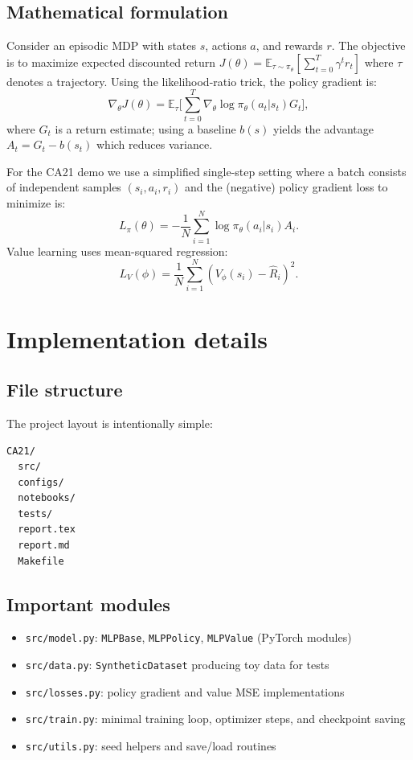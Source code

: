 \documentclass[11pt,a4paper]{article}
\newcommand{\code}[1]{\texttt{#1}}
\begin{document}
\subsection{Mathematical formulation}
Consider an episodic MDP with states $s$, actions $a$, and rewards $r$. The objective is to maximize expected discounted return $J(\theta)=\mathbb{E}_{\tau\sim\pi_\theta}[\sum_{t=0}^T \gamma^t r_t]$ where $\tau$ denotes a trajectory. Using the likelihood-ratio trick, the policy gradient is:
\begin{equation}
\nabla_\theta J(\theta)=\mathbb{E}_{\tau} \Big[ \sum_{t=0}^T \nabla_\theta \log \pi_\theta(a_t|s_t) G_t \Big],
\end{equation}
where $G_t$ is a return estimate; using a baseline $b(s)$ yields the advantage $A_t = G_t - b(s_t)$ which reduces variance.

For the CA21 demo we use a simplified single-step setting where a batch consists of independent samples $(s_i,a_i,r_i)$ and the (negative) policy gradient loss to minimize is:
\begin{equation}
L_{\pi}(\theta) = -\frac{1}{N} \sum_{i=1}^N \log \pi_\theta(a_i|s_i) A_i.
\end{equation}
Value learning uses mean-squared regression:
\begin{equation}
L_V(\phi) = \frac{1}{N} \sum_{i=1}^N (V_\phi(s_i) - \hat{R}_i)^2.
\end{equation}

\section{Implementation details}
\subsection{File structure}
The project layout is intentionally simple:
\begin{verbatim}
CA21/
  src/
  configs/
  notebooks/
  tests/
  report.tex
  report.md
  Makefile
\end{verbatim}

\subsection{Important modules}
\begin{itemize}
  \item \code{src/model.py}: \code{MLPBase}, \code{MLPPolicy}, \code{MLPValue} (PyTorch modules)
  \item \code{src/data.py}: \code{SyntheticDataset} producing toy data for tests
  \item \code{src/losses.py}: policy gradient and value MSE implementations
  \item \code{src/train.py}: minimal training loop, optimizer steps, and checkpoint saving
  \item \code{src/utils.py}: seed helpers and save/load routines
\end{itemize}
\end{document}
